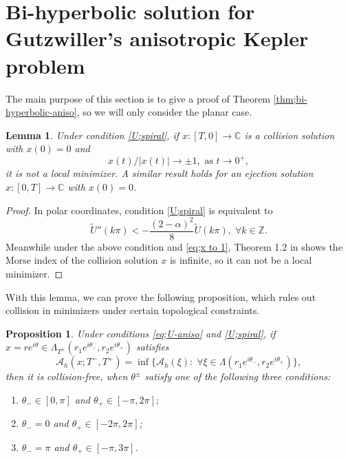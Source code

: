 \documentclass[11pt]{amsart}
\newcommand{\cc}{\mathbb C}
\newcommand{\zz}{\mathbb Z}
\newcommand{\A}{\mathcal A}
\newcommand{\al}{\alpha}
\newcommand{\tht}{\theta}
\newcommand{\Lmd}{\Lambda}
\theoremstyle{plain}
\newtheorem{prop}{Proposition}[section]
\newtheorem{lem}{Lemma}[section]
\theoremstyle{definition}
\theoremstyle{remark}
\begin{document}

\section{Bi-hyperbolic solution for Gutzwiller's anisotropic Kepler problem} 

The main purpose of this section is to give a proof of Theorem \ref{thm;bi-hyperbolic-aniso}, so we will only consider the planar case. 
\begin{lem}
\label{lem;HY} Under condition \eqref{U;spiral}, if $x:[T, 0] \to \cc$ is a collision solution with $x(0)=0$ and
\begin{equation}
	\label{eq;x to 1} x(t)/|x(t)| \to \pm 1, \text{ as } t \to 0^+,
\end{equation}
it is not a local minimizer. A similar result holds for an ejection solution $x:[0, T] \to \cc$ with $x(0)=0$. 
\end{lem}

\begin{proof}
In polar coordinates, condition \eqref{U;spiral} is equivalent to 
$$  \tilde{U}''(k\pi) < -\frac{(2-\al)^2}{8}\tilde{U}(k \pi), \; \forall k \in \zz. $$
Meanwhile under the above condition and \eqref{eq;x to 1}, Theorem 1.2 in \cite{HY18} shows the Morse index of the collision solution $x$ is infinite, so it can not be a local minimizer. 

\end{proof}

With this lemma, we can prove the following proposition, which rules out collision in minimizers under certain topological constraints. 
\begin{prop}
\label{prop;coll-free-top-2} Under conditions \eqref{eq;U-aniso} and \eqref{U;spiral}, if $x = re^{i\tht} \in \Lmd_{T^{\pm}}(r_1 e^{i\tht_-}, r_2 e^{i\tht_+})$ satisfies
$$ \A_h(x; T^-, T^+) = \inf \{  \A_h(\xi): \; \forall \xi \in \Lmd(r_1 e^{i\tht_-}, r_2 e^{i \tht_+}) \},$$
then it is collision-free, when $\tht^{\pm}$ satisfy one of the following three conditions:
\begin{enumerate}
\item[(i).] $\tht_- \in [0, \pi]$ and $\tht_+ \in [-\pi, 2\pi];$
\item[(ii).] $\tht_- =0$ and $\tht_+ \in [-2\pi, 2\pi]$;
\item[(iii).] $\tht_- = \pi$ and $\tht_+ \in [-\pi, 3\pi]$. 
\end{enumerate}
\end{prop}
\end{document}

